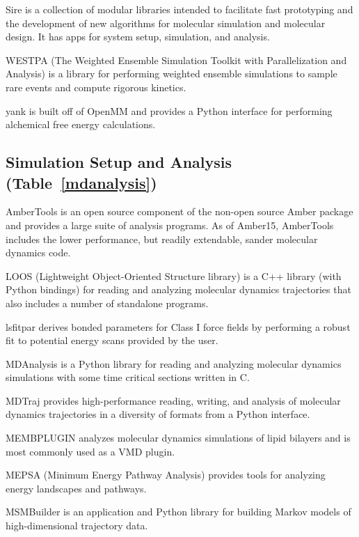 Sire is a collection of modular libraries intended to facilitate fast prototyping and the development of new algorithms for molecular simulation and molecular design. It has apps for system setup, simulation, and analysis.

WESTPA  (The Weighted Ensemble Simulation Toolkit with Parallelization and Analysis) \cite{Zwier_2015} is a library for performing weighted ensemble simulations to sample rare events and compute rigorous kinetics.

yank is built off of OpenMM and provides a Python interface for performing alchemical free energy calculations.

\subsection*{Simulation Setup and Analysis (Table~\ref{mdanalysis})}
AmberTools \cite{Salomon_Ferrer_2012} is an open source component of the non-open source Amber package and provides a large suite of analysis programs. As of Amber15, AmberTools includes the lower performance, but readily extendable,  sander molecular dynamics code.

LOOS (Lightweight Object-Oriented Structure library) \cite{Romo_2014} is a C++ library (with Python bindings) for reading and analyzing molecular dynamics trajectories that also includes a number of standalone programs.

lsfitpar \cite{Vanommeslaeghe_2015} derives bonded parameters for Class I force fields by performing a robust fit to potential energy scans provided by the user.

MDAnalysis  \cite{Michaud_Agrawal_2011} is a Python library for reading and analyzing molecular dynamics simulations with some time critical sections written in C.

MDTraj \cite{McGibbon_2015} provides high-performance reading, writing, and analysis of molecular dynamics trajectories in a diversity of formats from a Python interface.

MEMBPLUGIN \cite{Guixa-Gonzalez_2014} analyzes molecular dynamics simulations of lipid bilayers and is most commonly used as a VMD plugin.

MEPSA (Minimum Energy Pathway Analysis) \cite{Marcos_Alcalde_2015} provides tools for analyzing energy landscapes and pathways.

MSMBuilder \cite{Beauchamp_2011} is an application and Python library for building Markov models of high-dimensional trajectory data.

